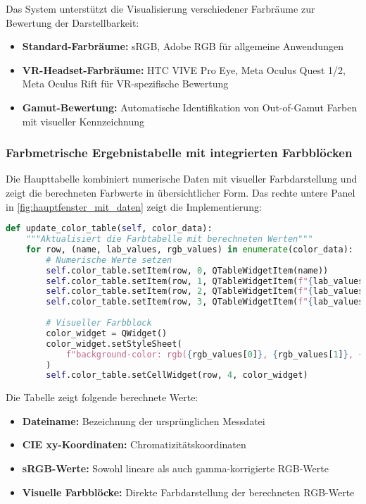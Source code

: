 Das System unterstützt die Visualisierung verschiedener Farbräume zur Bewertung der Darstellbarkeit:

\begin{itemize}
    \item \textbf{Standard-Farbräume:} sRGB, Adobe RGB für allgemeine Anwendungen
    \item \textbf{VR-Headset-Farbräume:} HTC VIVE Pro Eye, Meta Oculus Quest 1/2, Meta Oculus Rift für VR-spezifische Bewertung
    \item \textbf{Gamut-Bewertung:} Automatische Identifikation von Out-of-Gamut Farben mit visueller Kennzeichnung
\end{itemize}

\subsubsection{Farbmetrische Ergebnistabelle mit integrierten Farbblöcken}

Die Haupttabelle kombiniert numerische Daten mit visueller Farbdarstellung und zeigt die berechneten Farbwerte in übersichtlicher Form. Das rechte untere Panel in \ref{fig:hauptfenster_mit_daten} zeigt die Implementierung:

\begin{lstlisting}[language=Python, caption=Farbblock-Integration in Ergebnistabelle]
def update_color_table(self, color_data):
    """Aktualisiert die Farbtabelle mit berechneten Werten"""
    for row, (name, lab_values, rgb_values) in enumerate(color_data):
        # Numerische Werte setzen
        self.color_table.setItem(row, 0, QTableWidgetItem(name))
        self.color_table.setItem(row, 1, QTableWidgetItem(f"{lab_values[0]:.2f}"))
        self.color_table.setItem(row, 2, QTableWidgetItem(f"{lab_values[1]:.2f}"))
        self.color_table.setItem(row, 3, QTableWidgetItem(f"{lab_values[2]:.2f}"))
        
        # Visueller Farbblock
        color_widget = QWidget()
        color_widget.setStyleSheet(
            f"background-color: rgb({rgb_values[0]}, {rgb_values[1]}, {rgb_values[2]})"
        )
        self.color_table.setCellWidget(row, 4, color_widget)
\end{lstlisting}

Die Tabelle zeigt folgende berechnete Werte:

\begin{itemize}
    \item \textbf{Dateiname:} Bezeichnung der ursprünglichen Messdatei
    \item \textbf{CIE xy-Koordinaten:} Chromatizitätskoordinaten
    \item \textbf{sRGB-Werte:} Sowohl lineare als auch gamma-korrigierte RGB-Werte
    \item \textbf{Visuelle Farbblöcke:} Direkte Farbdarstellung der berechneten RGB-Werte
\end{itemize}

